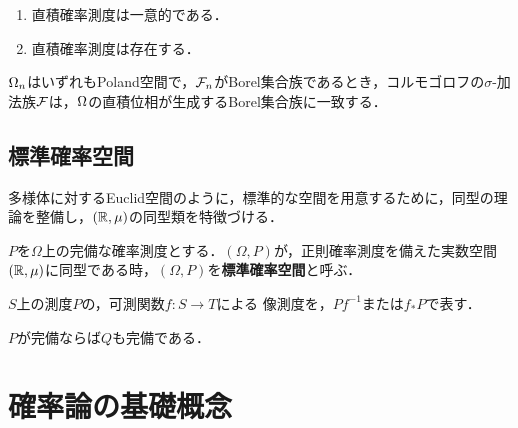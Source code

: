 \documentclass[uplatex,dvipdfmx]{jsreport}
\begin{document}
\begin{lemma}\mbox{}
    \begin{enumerate}
        \item 直積確率測度は一意的である．
        \item 直積確率測度は存在する．
    \end{enumerate}
\end{lemma}

\begin{theorem}\label{thm-product-sigma-algebra}
    $\Omega_n$はいずれもPoland空間で，$\mathcal{F}_n$がBorel集合族であるとき，コルモゴロフの$\sigma$-加法族$\mathcal{F}$は，$\Omega$の直積位相が生成するBorel集合族に一致する．
\end{theorem}

\section{標準確率空間}

\begin{tcolorbox}[colframe=ForestGreen, colback=ForestGreen!10!white,breakable,colbacktitle=ForestGreen!40!white,coltitle=black,fonttitle=\bfseries\sffamily,
title=]
    多様体に対するEuclid空間のように，標準的な空間を用意するために，同型の理論を整備し，$(\mathbb{R},\mu)$の同型類を特徴づける．
\end{tcolorbox}

\begin{definition}\label{def-canonical-measure}
    $P$を$\Omega$上の完備な確率測度とする．$(\Omega,P)$が，正則確率測度を備えた実数空間$(\mathbb{R},\mu)$に同型である時，$(\Omega,P)$を\textbf{標準確率空間}と呼ぶ．
\end{definition}

\begin{definition}
    $S$上の測度$P$の，可測関数$f:S\to T$による
    像測度を，$Pf^{-1}$または$f_*P$で表す．
\end{definition}

\begin{lemma}
    $P$が完備ならば$Q$も完備である．
\end{lemma}

\chapter{確率論の基礎概念}
\end{document}
